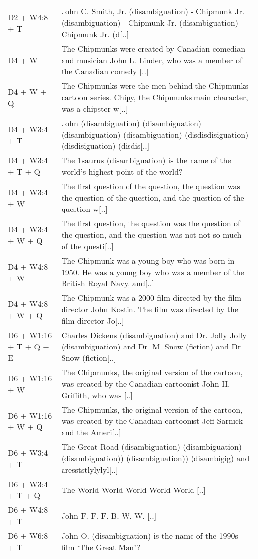 {\begin{longtable}{lp{8cm}}
D2 + W4:8 + T & John C. Smith, Jr. (disambiguation) - Chipmunk Jr. (disambiguation) - Chipmunk Jr. (disambiguation) - Chipmunk Jr. (d[..] \\
D4 + W & The Chipmunks were created by Canadian comedian and musician John L. Linder, who was a member of the Canadian comedy [..] \\
D4 + W + Q & The Chipmunks were the men behind the Chipmunks cartoon series. Chipy, the Chipmunks'main character, was a chipster w[..] \\
D4 + W3:4 + T & John (disambiguation) (disambiguation) (disambiguation) (disambiguation) (disdisdisiguation) (disdisiguation) (disdis[..] \\
D4 + W3:4 + T + Q & The 1saurus (disambiguation) is the name of the world's highest point of the world? \\
D4 + W3:4 + W & The first question of the question, the question was the question of the question, and the question of the question w[..] \\
D4 + W3:4 + W + Q & The first question, the question was the question of the question, and the question was not not so much of the questi[..] \\
D4 + W4:8 + W & The Chipmunk was a young boy who was born in 1950. He was a young boy who was a member of the British Royal Navy, and[..] \\
D4 + W4:8 + W + Q & The Chipmunk was a 2000 film directed by the film director John Kostin. The film was directed by the film director Jo[..] \\
D6 + W1:16 + T + Q + E & Charles Dickens (disambiguation) and Dr. Jolly Jolly (disambiguation) and Dr. M. Snow (fiction) and Dr. Snow (fiction[..] \\
D6 + W1:16 + W & The Chipmunks, the original version of the cartoon, was created by the Canadian cartoonist John H. Griffith, who was [..] \\
D6 + W1:16 + W + Q & The Chipmunks, the original version of the cartoon, was created by the Canadian cartoonist Jeff Sarnick and the Ameri[..] \\
D6 + W3:4 + T & The Great Road (disambiguation) (disambiguation) (disambiguation)) (disambiguation)) (disambigig) and aresststlylylyl[..] \\
D6 + W3:4 + T + Q & The World World World World World [..] \\
D6 + W4:8 + T & John F. F. F. B. W. W. [..] \\
D6 + W6:8 + T & John O. (disambiguation) is the name of the 1990s film ‘The Great Man’? \\

\end{longtable}}
